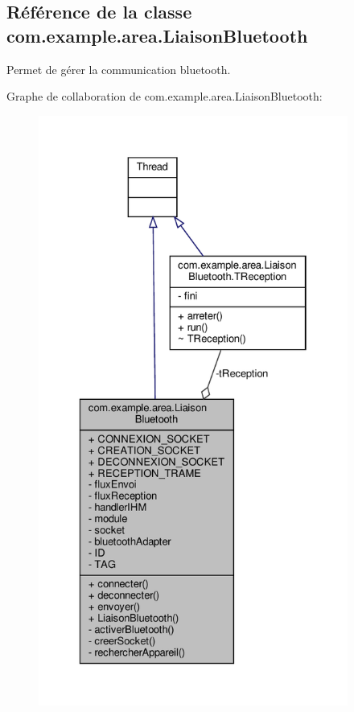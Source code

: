 \hypertarget{classcom_1_1example_1_1area_1_1_liaison_bluetooth}{}\subsection{Référence de la classe com.\+example.\+area.\+Liaison\+Bluetooth}
\label{classcom_1_1example_1_1area_1_1_liaison_bluetooth}


Permet de gérer la communication bluetooth.  




Graphe de collaboration de com.\+example.\+area.\+Liaison\+Bluetooth\+:
\nopagebreak
\begin{figure}[H]
\begin{center}
\leavevmode
\includegraphics[height=550pt]{classcom_1_1example_1_1area_1_1_liaison_bluetooth__coll__graph}
\end{center}
\end{figure}
